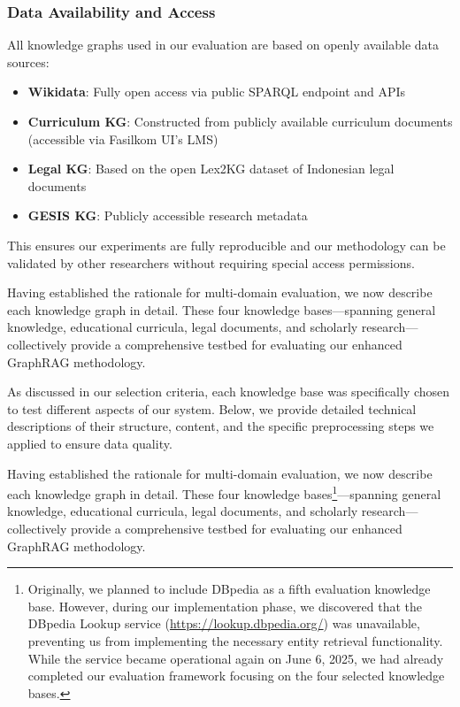 \subsubsection{Data Availability and Access}

All knowledge graphs used in our evaluation are based on openly available data sources:

\begin{itemize}
    \item \textbf{Wikidata}: Fully open access via public SPARQL endpoint and APIs
    \item \textbf{Curriculum KG}: Constructed from publicly available curriculum documents (accessible via Fasilkom UI's LMS)
    \item \textbf{Legal KG}: Based on the open Lex2KG dataset of Indonesian legal documents
    \item \textbf{GESIS KG}: Publicly accessible research metadata
\end{itemize}

This ensures our experiments are fully reproducible and our methodology can be validated by other researchers without requiring special access permissions.

Having established the rationale for multi-domain evaluation, we now describe each knowledge graph in detail. These four knowledge bases—spanning general knowledge, educational curricula, legal documents, and scholarly research—collectively provide a comprehensive testbed for evaluating our enhanced GraphRAG methodology.

As discussed in our selection criteria, each knowledge base was specifically chosen to test different aspects of our system. Below, we provide detailed technical descriptions of their structure, content, and the specific preprocessing steps we applied to ensure data quality.

Having established the rationale for multi-domain evaluation, we now describe each knowledge graph in detail. These four knowledge bases\footnote{Originally, we planned to include DBpedia as a fifth evaluation knowledge base. However, during our implementation phase, we discovered that the DBpedia Lookup service (\url{https://lookup.dbpedia.org/}) was unavailable, preventing us from implementing the necessary entity retrieval functionality. While the service became operational again on June 6, 2025, we had already completed our evaluation framework focusing on the four selected knowledge bases.}---spanning general knowledge, educational curricula, legal documents, and scholarly research---collectively provide a comprehensive testbed for evaluating our enhanced GraphRAG methodology.

